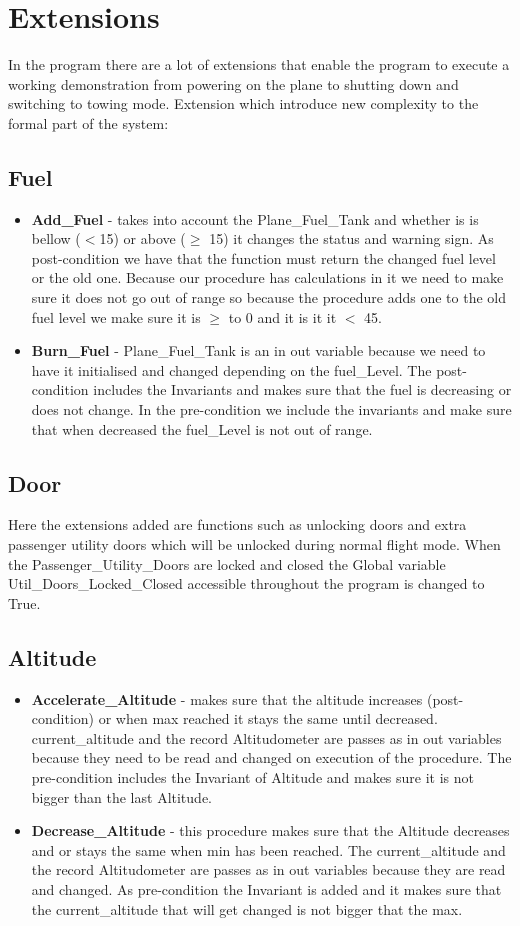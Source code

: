 \documentclass{llncs}
\begin{document}
\section{Extensions}
In the program there are a lot of extensions that enable the program to execute a working demonstration from powering on the plane to shutting down and switching to towing mode. 
Extension which introduce new complexity to the formal part of the system:
\subsection{Fuel}
\begin{itemize}
\item \textbf{Add\_Fuel} - takes into account the Plane\_Fuel\_Tank and whether is is bellow ($<$15) or above ($\geqslant$ 15) it changes the status and warning sign. As post-condition we have  that the function must return the changed fuel level or the old one. Because our procedure has calculations in it we need to make sure it does not go out of range so because the procedure adds one to the old fuel level we make sure it is $\geqslant$ to 0 and it is it it $<$ 45.
\item \textbf{Burn\_Fuel} - Plane\_Fuel\_Tank is an in out variable because we need to have it initialised and changed depending on the fuel\_Level. The post-condition  includes the Invariants and makes sure that the fuel is decreasing or does not change. In the pre-condition we include the invariants and make sure that when decreased the fuel\_Level is not out of range. 
\end{itemize}
\subsection{Door}
Here the extensions added are functions such as unlocking doors and extra passenger utility doors which will be unlocked during normal flight mode. When the Passenger\_Utility\_Doors are locked and closed the Global variable Util\_Doors\_Locked\_Closed accessible throughout the program is changed to True. 
\subsection{Altitude}
\begin{itemize}
\item \textbf{Accelerate\_Altitude} - makes sure that the altitude increases (post-condition) or when max reached it stays the same until decreased. current\_altitude and the record Altitudometer are passes as in out variables because they need to be read and changed on execution of the procedure. The pre-condition includes the Invariant of Altitude and makes sure it is not bigger than the last Altitude. 
\item \textbf{Decrease\_Altitude} - this procedure makes sure that the Altitude decreases and or stays the same when min has been reached. The current\_altitude and the record Altitudometer are passes as in out variables because they are read and changed. As pre-condition the Invariant is added and it makes sure that the current\_altitude that will get changed is not bigger that the max. 
\end{itemize}
\end{document}
